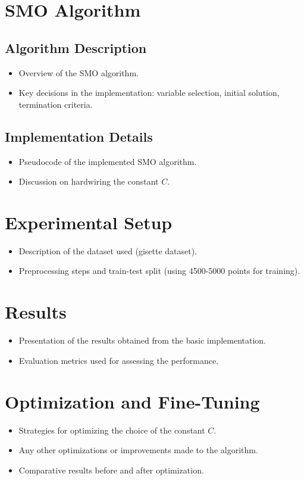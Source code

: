 \documentclass[10pt,a4paper]{article}
\newcounter{para}
\begin{document}
\section{SMO Algorithm}
\label{sec:smo}
\subsection{Algorithm Description}
\begin{itemize}
	\item Overview of the SMO algorithm.
	\item Key decisions in the implementation: variable selection, initial solution, termination criteria.
\end{itemize}

\subsection{Implementation Details}
\begin{itemize}
	\item Pseudocode of the implemented SMO algorithm.
	\item Discussion on hardwiring the constant \(C\).
\end{itemize}

\section{Experimental Setup}
\label{sec:experiments}
\begin{itemize}
	\item Description of the dataset used (gisette dataset).
	\item Preprocessing steps and train-test split (using 4500-5000 points for training).
\end{itemize}

\section{Results}
\label{sec:results}
\begin{itemize}
	\item Presentation of the results obtained from the basic implementation.
	\item Evaluation metrics used for assessing the performance.
\end{itemize}

\section{Optimization and Fine-Tuning}
\label{sec:optimization}
\begin{itemize}
	\item Strategies for optimizing the choice of the constant \(C\).
	\item Any other optimizations or improvements made to the algorithm.
	\item Comparative results before and after optimization.
\end{itemize}
\end{document}
